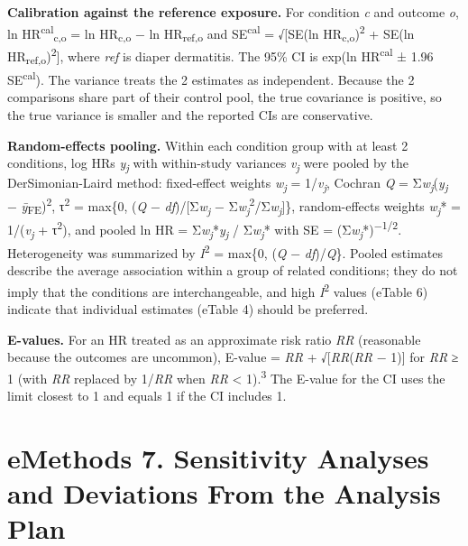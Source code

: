 \documentclass[11pt]{article}
\begin{document}
\textbf{Calibration against the reference exposure.} For
condition \emph{c} and outcome \emph{o}, ln
HR\textsuperscript{cal}\textsubscript{c,o} = ln
HR\textsubscript{c,o} − ln HR\textsubscript{ref,o} and
SE\textsuperscript{cal} = √{[}SE(ln
HR\textsubscript{c,o})\textsuperscript{2} + SE(ln
HR\textsubscript{ref,o})\textsuperscript{2}{]}, where
\emph{ref} is diaper dermatitis. The 95\% CI is exp(ln
HR\textsuperscript{cal} ± 1.96 SE\textsuperscript{cal}). The
variance treats the 2 estimates as independent. Because the
2 comparisons share part of their control pool, the true
covariance is positive, so the true variance is smaller and
the reported CIs are conservative.

\textbf{Random-effects pooling.} Within each condition group
with at least 2 conditions, log HRs
\emph{y\textsubscript{j}} with within-study variances
\emph{v\textsubscript{j}} were pooled by the
DerSimonian-Laird method: fixed-effect weights
\emph{w\textsubscript{j}} = 1/\emph{v\textsubscript{j}},
Cochran \emph{Q} =
Σ\emph{w\textsubscript{j}}(\emph{y\textsubscript{j}} −
\emph{ȳ}\textsubscript{FE})\textsuperscript{2},
τ\textsuperscript{2} = max\{0, (\emph{Q} −
\emph{df})/{[}Σ\emph{w\textsubscript{j}} −
Σ\emph{w\textsubscript{j}}\textsuperscript{2}/Σ\emph{w\textsubscript{j}}{]}\},
random-effects weights \emph{w\textsubscript{j}}* =
1/(\emph{v\textsubscript{j}} + τ\textsuperscript{2}), and
pooled ln HR =
Σ\emph{w\textsubscript{j}}*\emph{y\textsubscript{j}} /
Σ\emph{w\textsubscript{j}}* with SE =
(Σ\emph{w\textsubscript{j}}*)\textsuperscript{−1/2}.
Heterogeneity was summarized by \emph{I}\textsuperscript{2}
= max\{0, (\emph{Q} − \emph{df})/\emph{Q}\}. Pooled
estimates describe the average association within a group of
related conditions; they do not imply that the conditions
are interchangeable, and high \emph{I}\textsuperscript{2}
values (eTable 6) indicate that individual estimates (eTable
4) should be preferred.

\textbf{E-values.} For an HR treated as an approximate risk
ratio \emph{RR} (reasonable because the outcomes are
uncommon), E-value = \emph{RR} + √{[}\emph{RR}(\emph{RR} −
1){]} for \emph{RR} ≥ 1 (with \emph{RR} replaced by
1/\emph{RR} when \emph{RR} \textless{}
1).\textsuperscript{3} The E-value for the CI uses the limit
closest to 1 and equals 1 if the CI includes 1.

\hypertarget{emethods-7.-sensitivity-analyses-and-deviations-from-the-analysis-plan}{%
\section*{eMethods 7. Sensitivity Analyses and Deviations
From the Analysis
Plan}\label{emethods-7.-sensitivity-analyses-and-deviations-from-the-analysis-plan}}
\end{document}
